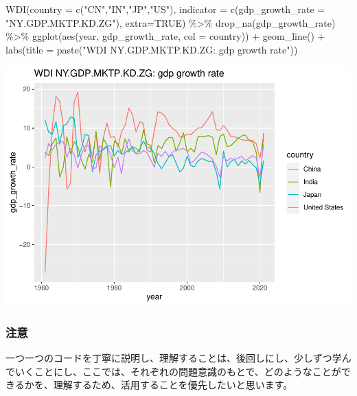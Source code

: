 \documentclass[
]{article}
\newenvironment{Shaded}{\begin{snugshade}}{\end{snugshade}}
\newcommand{\AttributeTok}[1]{\textcolor[rgb]{0.77,0.63,0.00}{#1}}
\newcommand{\ConstantTok}[1]{\textcolor[rgb]{0.00,0.00,0.00}{#1}}
\newcommand{\FunctionTok}[1]{\textcolor[rgb]{0.00,0.00,0.00}{#1}}
\newcommand{\NormalTok}[1]{#1}
\newcommand{\SpecialCharTok}[1]{\textcolor[rgb]{0.00,0.00,0.00}{#1}}
\newcommand{\StringTok}[1]{\textcolor[rgb]{0.31,0.60,0.02}{#1}}
\begin{document}
\begin{Shaded}
\begin{Highlighting}[]
\FunctionTok{WDI}\NormalTok{(}\AttributeTok{country =} \FunctionTok{c}\NormalTok{(}\StringTok{"CN"}\NormalTok{,}\StringTok{"IN"}\NormalTok{,}\StringTok{"JP"}\NormalTok{,}\StringTok{"US"}\NormalTok{), }
    \AttributeTok{indicator =} \FunctionTok{c}\NormalTok{(}\AttributeTok{gdp\_growth\_rate =} \StringTok{"NY.GDP.MKTP.KD.ZG"}\NormalTok{), }\AttributeTok{extra=}\ConstantTok{TRUE}\NormalTok{) }\SpecialCharTok{\%\textgreater{}\%}
  \FunctionTok{drop\_na}\NormalTok{(gdp\_growth\_rate) }\SpecialCharTok{\%\textgreater{}\%} 
  \FunctionTok{ggplot}\NormalTok{(}\FunctionTok{aes}\NormalTok{(year, gdp\_growth\_rate, }\AttributeTok{col =}\NormalTok{ country)) }\SpecialCharTok{+} \FunctionTok{geom\_line}\NormalTok{() }\SpecialCharTok{+}
  \FunctionTok{labs}\NormalTok{(}\AttributeTok{title =} \FunctionTok{paste}\NormalTok{(}\StringTok{"WDI NY.GDP.MKTP.KD.ZG: gdp growth rate"}\NormalTok{))}
\end{Highlighting}
\end{Shaded}

\includegraphics{intro2rj-short_files/figure-latex/unnamed-chunk-11-1.pdf}

\hypertarget{ux6ce8ux610f}{%
\subsubsection{注意}\label{ux6ce8ux610f}}

一つ一つのコードを丁寧に説明し、理解することは、後回しにし、少しずつ学んでいくことにし、ここでは、それぞれの問題意識のもとで、どのようなことができるかを、理解するため、活用することを優先したいと思います。
\end{document}
